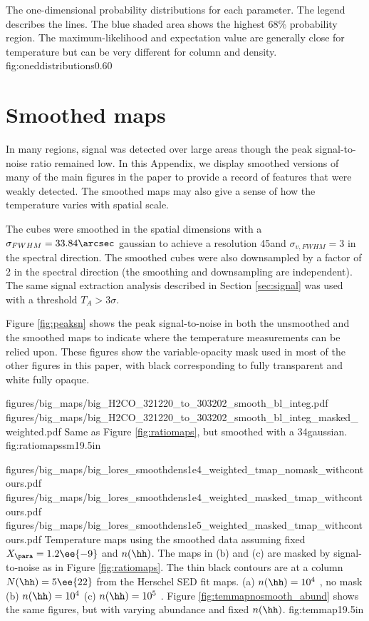 {The one-dimensional probability distributions for each parameter.  The legend
describes the lines.  The blue shaded area shows the highest 68\% probability
region.  The maximum-likelihood and expectation value are generally
close for temperature but can be very different for column and density.}
{fig:oneddistributions}{0.6}{0}

\section{Smoothed maps}
\label{appendix:smoothed}
In many regions, signal was detected over large areas though the peak
signal-to-noise ratio remained low.  In this Appendix, we display smoothed
versions of many of the main figures in the paper to provide a record of
features that were weakly detected.  The smoothed maps may also give a sense
of how the temperature varies with spatial scale.

The cubes were smoothed in the spatial dimensions with a
$\sigma_{FWHM}=33.84\arcsec$ gaussian to achieve a resolution 45\arcsec and
$\sigma_{v, FWHM} = 3$ \kms in the spectral direction.  The smoothed cubes were
also downsampled by a factor of 2 in the spectral direction (the smoothing and
downsampling are independent).  
The same signal extraction analysis described in Section \ref{sec:signal} was used with a
threshold $T_A > 3\sigma$.  

Figure \ref{fig:peaksn} shows the peak signal-to-noise in both the unsmoothed
and the smoothed maps to indicate where the temperature measurements can be
relied upon.  These figures show the variable-opacity mask used in most of the
other figures in this paper, with black corresponding to fully transparent and
white fully opaque.


\RotFigureTwoAA
{figures/big_maps/big_H2CO_321220_to_303202_smooth_bl_integ.pdf}
{figures/big_maps/big_H2CO_321220_to_303202_smooth_bl_integ_masked_weighted.pdf}
{Same as Figure \ref{fig:ratiomaps}, but smoothed with a 34\arcsec gaussian.
}
{fig:ratiomapssm}{1}{9.5in}


\RotFigureThreeAA
{figures/big_maps/big_lores_smoothdens1e4_weighted_tmap_nomask_withcontours.pdf}
{figures/big_maps/big_lores_smoothdens1e4_weighted_masked_tmap_withcontours.pdf}
{figures/big_maps/big_lores_smoothdens1e5_weighted_masked_tmap_withcontours.pdf}
{Temperature maps using the smoothed data assuming fixed $X_{\para}=1.2\ee{-9}$
and $n(\hh)$.  The maps in (b) and (c) are masked by signal-to-noise as in Figure
\ref{fig:ratiomaps}.  The thin black contours are at a column $N(\hh)=5\ee{22}$
\percc from the Herschel SED fit maps.
(a) $n(\hh) = 10^4$ \percc, no mask
(b) $n(\hh) = 10^4$ \percc
(c) $n(\hh) = 10^5$ \percc.
Figure \ref{fig:temmapnosmooth_abund} shows the same figures, but with varying
abundance and fixed $n(\hh)$.
}
{fig:temmap}{1}{9.5in}


